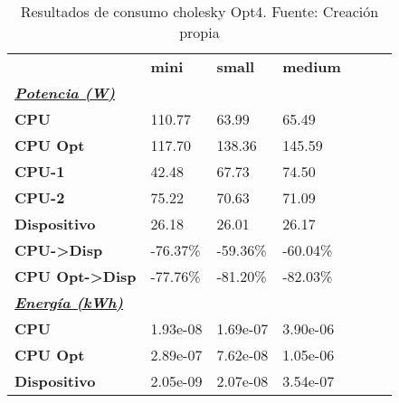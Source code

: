 \begin{table}[H]
    \centering
    \begin{tabular}{lllllll}
    \rowcolor[HTML]{DAE8FC} \ & \textbf{mini} & \textbf{	small} & \textbf{	medium} \\
    \cellcolor[HTML]{DAE8FC} \textbf{\textbf{{\emph{{\underline{{Potencia (W)}}}}}}} &  & 	 & 	 \\
    \rowcolor[HTML]{EFEFEF} \cellcolor[HTML]{DAE8FC} \textbf{CPU} & 110.77 & 	63.99 & 	65.49 \\
    \cellcolor[HTML]{DAE8FC} \textbf{CPU Opt} & 117.70 & 	138.36 & 	145.59 \\
    \rowcolor[HTML]{EFEFEF} \cellcolor[HTML]{DAE8FC} \textbf{\quad CPU-1} & 42.48 & 	67.73 & 	74.50 \\
    \cellcolor[HTML]{DAE8FC} \textbf{\quad CPU-2} & 75.22 & 	70.63 & 	71.09 \\
    \rowcolor[HTML]{EFEFEF} \cellcolor[HTML]{DAE8FC} \textbf{Dispositivo} & 26.18 & 	26.01 & 	26.17 \\
    \cellcolor[HTML]{DAE8FC} \textbf{CPU->Disp} & -76.37\% & 	-59.36\% & 	-60.04\% \\
    \rowcolor[HTML]{EFEFEF} \cellcolor[HTML]{DAE8FC} \textbf{CPU Opt->Disp} & -77.76\% & 	-81.20\% & 	-82.03\% \\
    \cellcolor[HTML]{DAE8FC} \textbf{\textbf{{\emph{{\underline{{Energía (kWh)}}}}}}} &  & 	 & 	 \\
    \rowcolor[HTML]{EFEFEF} \cellcolor[HTML]{DAE8FC} \textbf{CPU} & 1.93e-08 & 	1.69e-07 & 	3.90e-06 \\
    \cellcolor[HTML]{DAE8FC} \textbf{CPU Opt} & 2.89e-07 & 	7.62e-08 & 	1.05e-06 \\
    \rowcolor[HTML]{EFEFEF} \cellcolor[HTML]{DAE8FC} \textbf{Dispositivo} & 2.05e-09 & 	2.07e-08 & 	3.54e-07 \\
    \end{tabular}
    \caption[Resultados de consumo cholesky Opt4]{{Resultados de consumo cholesky Opt4. Fuente: Creación propia}}
    \label{table_test_cholesky_Opt4_hw_powerResults}
\end{table}